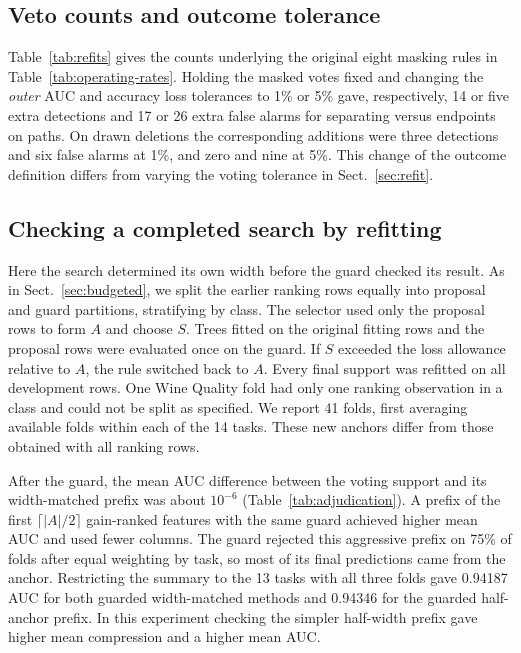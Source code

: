 \subsection{Veto counts and outcome tolerance}
Table~\ref{tab:refits} gives the counts underlying the original eight masking rules in Table~\ref{tab:operating-rates}. Holding the masked votes fixed and changing the \emph{outer} AUC and accuracy loss tolerances to 1\% or 5\% gave, respectively, 14 or five extra detections and 17 or 26 extra false alarms for separating versus endpoints on paths. On drawn deletions the corresponding additions were three detections and six false alarms at 1\%, and zero and nine at 5\%. This change of the outcome definition differs from varying the voting tolerance in Sect.~\ref{sec:refit}.



\subsection{Checking a completed search by refitting}
Here the search determined its own width before the guard checked its result. As in Sect.~\ref{sec:budgeted}, we split the earlier ranking rows equally into proposal and guard partitions, stratifying by class. The selector used only the proposal rows to form $A$ and choose $S$. Trees fitted on the original fitting rows and the proposal rows were evaluated once on the guard. If $S$ exceeded the loss allowance relative to $A$, the rule switched back to $A$. Every final support was refitted on all development rows. One Wine Quality fold had only one ranking observation in a class and could not be split as specified. We report 41 folds, first averaging available folds within each of the 14 tasks. These new anchors differ from those obtained with all ranking rows.



After the guard, the mean AUC difference between the voting support and its width-matched prefix was about $10^{-6}$ (Table~\ref{tab:adjudication}). A prefix of the first $\lceil |A|/2\rceil$ gain-ranked features with the same guard achieved higher mean AUC and used fewer columns. The guard rejected this aggressive prefix on 75\% of folds after equal weighting by task, so most of its final predictions came from the anchor. Restricting the summary to the 13 tasks with all three folds gave 0.94187 AUC for both guarded width-matched methods and 0.94346 for the guarded half-anchor prefix. In this experiment checking the simpler half-width prefix gave higher mean compression and a higher mean AUC.

